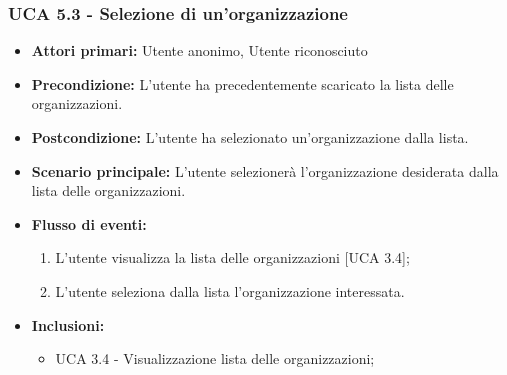 \subsubsection{UCA 5.3 - Selezione di un'organizzazione}
\begin{itemize}
    \item \textbf{Attori primari:} Utente anonimo, Utente riconosciuto
    \item \textbf{Precondizione:} L'utente ha precedentemente scaricato la lista delle organizzazioni.
    \item \textbf{Postcondizione:} L'utente ha selezionato un'organizzazione dalla lista.
    \item \textbf{Scenario principale:} L'utente selezionerà l'organizzazione desiderata dalla lista delle organizzazioni.
    \item \textbf{Flusso di eventi:}
    \begin{enumerate}
        \item L'utente visualizza la lista delle organizzazioni [UCA 3.4];
        \item L'utente seleziona dalla lista l'organizzazione interessata.
    \end{enumerate}
    \item \textbf{Inclusioni:}
    \begin{itemize}
        \item UCA 3.4 - Visualizzazione lista delle organizzazioni;
    \end{itemize}
\end{itemize}